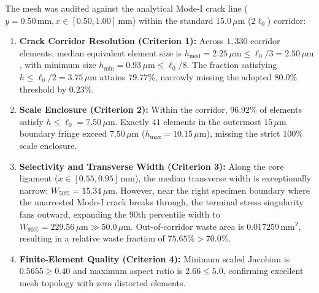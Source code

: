 The mesh was audited against the analytical Mode-I crack line ($y = 0.50\,\mathrm{mm}, x \in [0.50, 1.00]\,\mathrm{mm}$) within the standard $15.0\,\mu\mathrm{m}$ ($2\ell_0$) corridor:
\begin{enumerate}
  \item \textbf{Crack Corridor Resolution (Criterion 1):} Across $1{,}330$ corridor elements, median equivalent element size is $h_{\mathrm{med}} = 2.25\,\mu\mathrm{m} \le \ell_0/3 = 2.50\,\mu\mathrm{m}$, with minimum size $h_{\min} = 0.93\,\mu\mathrm{m} \le \ell_0/8$. The fraction satisfying $h \le \ell_0/2 = 3.75\,\mu\mathrm{m}$ attains $79.77\%$, narrowly missing the adopted $80.0\%$ threshold by $0.23\%$.
  \item \textbf{Scale Enclosure (Criterion 2):} Within the corridor, $96.92\%$ of elements satisfy $h \le \ell_0 = 7.50\,\mu\mathrm{m}$. Exactly $41$ elements in the outermost $15\,\mu\mathrm{m}$ boundary fringe exceed $7.50\,\mu\mathrm{m}$ ($h_{\max} = 10.15\,\mu\mathrm{m}$), missing the strict $100\%$ scale enclosure.
  \item \textbf{Selectivity and Transverse Width (Criterion 3):} Along the core ligament ($x \in [0.55, 0.95]\,\mathrm{mm}$), the median transverse width is exceptionally narrow: $W_{50\%} = 15.34\,\mu\mathrm{m}$. However, near the right specimen boundary where the unarrested Mode-I crack breaks through, the terminal stress singularity fans outward, expanding the 90th percentile width to $W_{90\%} = 229.56\,\mu\mathrm{m} \gg 50.0\,\mu\mathrm{m}$. Out-of-corridor waste area is $0.017259\,\mathrm{mm}^2$, resulting in a relative waste fraction of $75.65\% > 70.0\%$.
  \item \textbf{Finite-Element Quality (Criterion 4):} Minimum scaled Jacobian is $0.5655 \ge 0.40$ and maximum aspect ratio is $2.66 \le 5.0$, confirming excellent mesh topology with zero distorted elements.
\end{enumerate}

